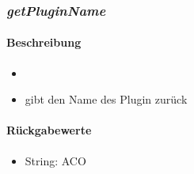 \subsubsection*{\textit{getPluginName}}\label{getPluginName}
\paragraph{Beschreibung}
\begin{itemize}
	\item[]\noindent{}
	\item[] gibt den Name des Plugin zurück
\end{itemize}
\paragraph{Rückgabewerte}
\begin{itemize}
	\item[] String: ACO
\end{itemize}